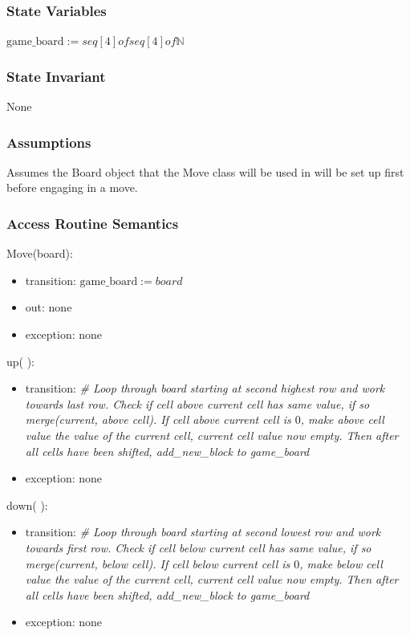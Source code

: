 \documentclass[12pt]{article}
\begin{document}
\subsubsection* {State Variables}

$\text{game\_board} := seq[4] of seq[4] of \mathbb{N}$

\subsubsection* {State Invariant}

None

\subsubsection* {Assumptions}

Assumes the Board object that the Move class will be used in will be set up first before engaging in a move.  

\subsubsection* {Access Routine Semantics}

\noindent Move(board):
\begin{itemize}
\item transition: $\text{game\_board} := board$
\item out: none
\item exception: none
\end{itemize}

\noindent up( ):
\begin{itemize}
\item transition: \textit{\# Loop through board starting at second highest row and work towards last row. Check if cell above current cell has same value, if so merge(current, above cell). If cell above current cell is $0$, make above cell value the value of the current cell, current cell value now empty. Then after all cells have been shifted, add\_new\_block to game\_board} ~\\
\item exception: none
\end{itemize}

\noindent down( ):
\begin{itemize}
\item transition: \textit{\# Loop through board starting at second lowest row and work towards first row. Check if cell below current cell has same value, if so merge(current, below cell). If cell below current cell is $0$, make below cell value the value of the current cell, current cell value now empty. Then after all cells have been shifted, add\_new\_block to game\_board} ~\\
\item exception: none
\end{itemize}
\end{document}
